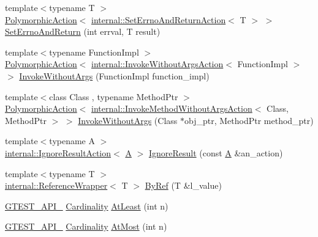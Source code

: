 \begin{DoxyCompactItemize}
\item 
{\footnotesize template$<$typename T $>$ }\\\hyperlink{classtesting_1_1PolymorphicAction}{Polymorphic\+Action}$<$ \hyperlink{classtesting_1_1internal_1_1SetErrnoAndReturnAction}{internal\+::\+Set\+Errno\+And\+Return\+Action}$<$ T $>$ $>$ \hyperlink{namespacetesting_a31095e421f167fade2e6d4d60df1f4da}{Set\+Errno\+And\+Return} (int errval, T result)
\item 
{\footnotesize template$<$typename Function\+Impl $>$ }\\\hyperlink{classtesting_1_1PolymorphicAction}{Polymorphic\+Action}$<$ \hyperlink{classtesting_1_1internal_1_1InvokeWithoutArgsAction}{internal\+::\+Invoke\+Without\+Args\+Action}$<$ Function\+Impl $>$ $>$ \hyperlink{namespacetesting_a88cc1999296bc630f6a49cdf66bb21f9}{Invoke\+Without\+Args} (Function\+Impl function\+\_\+impl)
\item 
{\footnotesize template$<$class Class , typename Method\+Ptr $>$ }\\\hyperlink{classtesting_1_1PolymorphicAction}{Polymorphic\+Action}$<$ \hyperlink{classtesting_1_1internal_1_1InvokeMethodWithoutArgsAction}{internal\+::\+Invoke\+Method\+Without\+Args\+Action}$<$ Class, Method\+Ptr $>$ $>$ \hyperlink{namespacetesting_ab75325d71a8c37db94f349243815c728}{Invoke\+Without\+Args} (Class $\ast$obj\+\_\+ptr, Method\+Ptr method\+\_\+ptr)
\item 
{\footnotesize template$<$typename A $>$ }\\\hyperlink{classtesting_1_1internal_1_1IgnoreResultAction}{internal\+::\+Ignore\+Result\+Action}$<$ \hyperlink{namespacetesting_a5e9134d655d2fc9323902348083282e7}{A} $>$ \hyperlink{namespacetesting_a50ae42540a31047c7fddd32df8d835f5}{Ignore\+Result} (const \hyperlink{namespacetesting_a5e9134d655d2fc9323902348083282e7}{A} \&an\+\_\+action)
\item 
{\footnotesize template$<$typename T $>$ }\\\hyperlink{classtesting_1_1internal_1_1ReferenceWrapper}{internal\+::\+Reference\+Wrapper}$<$ T $>$ \hyperlink{namespacetesting_aaee6d42dcd69de6e7a1459c5c71222c3}{By\+Ref} (T \&l\+\_\+value)
\item 
\hyperlink{gtest-port_8h_aa73be6f0ba4a7456180a94904ce17790}{G\+T\+E\+S\+T\+\_\+\+A\+P\+I\+\_\+} \hyperlink{classtesting_1_1Cardinality}{Cardinality} \hyperlink{namespacetesting_a137297cb3c582843989fbd937cf0fed2}{At\+Least} (int n)
\item 
\hyperlink{gtest-port_8h_aa73be6f0ba4a7456180a94904ce17790}{G\+T\+E\+S\+T\+\_\+\+A\+P\+I\+\_\+} \hyperlink{classtesting_1_1Cardinality}{Cardinality} \hyperlink{namespacetesting_a5487cd1068c78821ced96fbf542a91bb}{At\+Most} (int n)

\end{DoxyCompactItemize}
